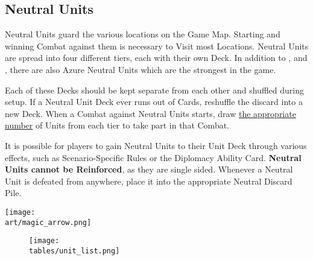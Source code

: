 \begin{multicols}{2}
\subsection*{Neutral Units}
Neutral Units guard the various locations on the Game Map.
Starting and winning Combat against them is necessary to Visit most Locations.
Neutral Units are spread into four different tiers, each with their own Deck.
In addition to ,  and , there are also Azure  Neutral Units which are the strongest in the game.\par
Each of these Decks should be kept separate from each other and shuffled during setup.
If a Neutral Unit Deck ever runs out of Cards, reshuffle the discard into a new Deck.
When a Combat against Neutral Units starts, draw \hyperlink{Difficulty}{the appropriate number} of Units from each tier to take part in that Combat.\par
It is possible for players to gain Neutral Units to their Unit Deck through various effects, such as Scenario-Specific Rules or the Diplomacy Ability Card.
\textbf{Neutral Units cannot be Reinforced}, as they are single sided.
Whenever a Neutral Unit is defeated from anywhere, place it into the appropriate Neutral Discard Pile.\par

\bigskip

\texttt{[image: \\art/magic\_arrow.png]}

\end{multicols}

\begin{figure}[h]
  \centering
  \texttt{[image: \\tables/unit\_list.png]}
\end{figure}

\clearpage


